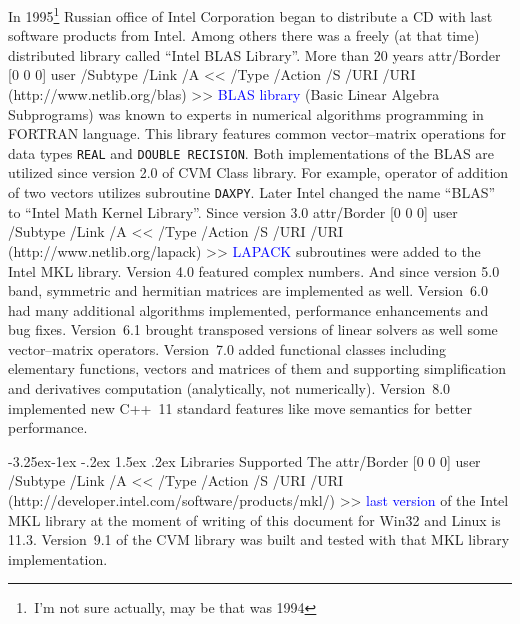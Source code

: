 \documentclass[12pt,letterpaper]{article}
\makeatletter
\newcommand{\URL}[2]{%
    \pdfstartlink attr{/Border [0 0 0]} user{%
    /Subtype /Link
    /A <<
        /Type /Action
        /S /URI
        /URI (#2)
    >>}%
\textcolor{blue}{#1}%
\pdfendlink}
\newcommand{\FORTRAN}{\textsf{FORTRAN}\xspace}
\newcommand{\CVMVERSION}{9.1\xspace}
\newcommand{\MKLVERSION}{11.3}
\renewcommand\subsection{\@startsection{subsection}{2}{0mm}%
                                     {-3.25ex\@plus -1ex \@minus -.2ex}%
                                     {1.5ex \@plus .2ex}%
                                     {\normalfont\large\bfseries\sffamily}}
\makeatother
\begin{document}
In 1995\footnote{\,I'm not sure actually, may be that was 1994}
Russian office of Intel Corporation began to distribute a CD with
last software products from Intel. Among others there was a freely
(at that time) distributed library called ``Intel BLAS Library''.
More than 20 years \URL{BLAS library}{http://www.netlib.org/blas}
(Basic Linear Algebra Subprograms) was known to experts in numerical
algorithms programming in \FORTRAN language. This library features
common vector--matrix operations for data types \verb"REAL" and
\verb"DOUBLE RECISION". 
Both implementations of the BLAS are utilized since version 2.0 of
CVM Class library. For example, operator of addition of two vectors
utilizes subroutine \verb"DAXPY". Later Intel changed the name
``BLAS'' to ``Intel Math Kernel Library''. Since version 3.0
\URL{LAPACK}{http://www.netlib.org/lapack} subroutines were
added to the Intel MKL library.
Version 4.0 featured complex numbers. And since version
5.0 band, symmetric and hermitian matrices are implemented as well.
Version~6.0 had many additional algorithms implemented, performance 
enhancements and bug fixes. Version~6.1 brought transposed versions of 
linear solvers as well some vec\-tor--matrix operators.
Version~7.0 added functional classes including elementary functions,
vectors and matrices of them and supporting simplification and
derivatives computation (analytically, not numerically).
Version~8.0 implemented new C++~11 standard features like move semantics 
for better performance.

\subsection{Libraries Supported}
The
\URL{last version}{http://developer.intel.com/software/products/mkl/} of the
Intel MKL library at the moment of writing of this document for Win32 and
Linux is \MKLVERSION. Version~\CVMVERSION of the CVM library was 
built and tested with that MKL library implementation.

\end{document}

